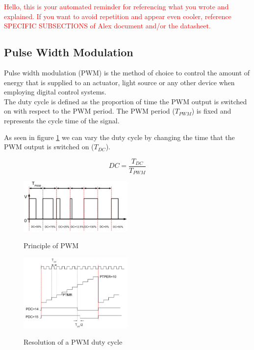 \textcolor{red}{Hello, this is your automated reminder for referencing what you wrote and explained. If you want to avoid repetition and appear even cooler, reference SPECIFIC SUBSECTIONS of Alex document and/or the datasheet.}

\subsection{Pulse Width Modulation} 

\noindent
Pulse width modulation (PWM) is the method of choice to control the amount of energy that is supplied to an actuator, light source or any other device when employing digital control systems.\\
The duty cycle is defined as the proportion of time the PWM output is switched on with respect to the PWM period.
The PWM period ($T_{PWM}$) is fixed and represents the cycle time of the signal.

\noindent
As seen in figure \ref{fig:pwm_demo} we can vary the duty cycle by changing the time that the PWM output is switched on ($T_{DC}$).

$$DC = \frac{T_{DC}}{T_{PWM}}$$

\begin{figure}[H]
    \caption{Principle of PWM \cite{alex}}
        \centering
            \includegraphics[width=0.5\textwidth]{figures/software/pwm_demo.png}
            \label{fig:pwm_demo}
\end{figure}

\begin{figure}[H]
    \caption{Resolution of a PWM duty cycle \cite{alex}}
        \centering
            \includegraphics[width=0.5\textwidth]{figures/software/pwm_choice.png}
            \label{fig:pwm_choice}
\end{figure}

